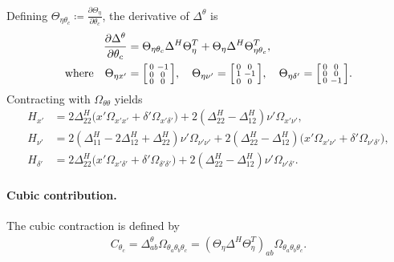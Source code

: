 \documentclass{article}
\begin{document}
Defining $\Theta_{\eta\theta_c} \coloneqq \frac{\partial \Theta_\eta}{\partial \theta_c}$, the derivative of $\Delta^\theta$ is
%
\begin{align}
  \frac{\partial \Delta^\theta}{\partial \theta_c} & = \Theta_{\eta\theta_c} \Delta^H \Theta_\eta^T + \Theta_\eta \Delta^H \Theta_{\eta\theta_c}^T, \\
  \text{where} \quad
  \Theta_{\eta x'}                                 & = \begin{bsmallmatrix} 0 & -1 \\ 0 & 0 \\ 0 & 0 \end{bsmallmatrix},
  \quad
  \Theta_{\eta\nu'} = \begin{bsmallmatrix} 0 & 0 \\ 1 & -1 \\ 0 & 0 \end{bsmallmatrix},
  \quad
  \Theta_{\eta\delta'} = \begin{bsmallmatrix} 0 & 0 \\ 0 & 0 \\ 0 & -1 \end{bsmallmatrix}.
\end{align}
%
Contracting with $\Omega_{\theta\theta}$ yields
%
\begin{align}
  H_{x'}      & = 2 \Delta^H_{22} \big( x' \Omega_{x'x'} + \delta' \Omega_{x'\delta'} \big) + 2(\Delta^H_{22} - \Delta^H_{12}) \nu' \Omega_{x'\nu'},                                         \\
  H_{\nu'}    & = 2(\Delta^H_{11} - 2\Delta^H_{12} + \Delta^H_{22}) \nu' \Omega_{\nu'\nu'} + 2(\Delta^H_{22} - \Delta^H_{12}) \big( x' \Omega_{x'\nu'} + \delta' \Omega_{\nu'\delta'} \big), \\
  H_{\delta'} & = 2 \Delta^H_{22} \big( x' \Omega_{x'\delta'} + \delta' \Omega_{\delta'\delta'} \big) + 2(\Delta^H_{22} - \Delta^H_{12}) \nu' \Omega_{\nu'\delta'}.
\end{align}

\paragraph{Cubic contribution.}

The cubic contraction is defined by
%
\begin{align}
  C_{\theta_c} = \Delta^\theta_{ab} \Omega_{\theta_a \theta_b \theta_c}
  = (\Theta_\eta \Delta^H \Theta_\eta^T)_{ab} \Omega_{\theta_a \theta_b \theta_c}.
\end{align}
\end{document}
